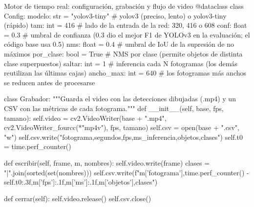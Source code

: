 \documentclass[11pt,letterpaper]{article}
\begin{document}
\begin{codigo}[label=cod:flujo]{Motor de tiempo real: configuración, grabación y flujo de video}
@dataclass
class Config:
    modelo: str = "yolov3-tiny"     # yolov3 (preciso, lento) o yolov3-tiny (rápido)
    tam: int = 416                  # lado de la entrada de la red: 320, 416 o 608
    conf: float = 0.3               # umbral de confianza (0.3 dio el mejor F1 de YOLOv3 en la evaluación; el código base usa 0.5)
    nms: float = 0.4                # umbral de IoU de la supresión de no máximos
    por_clase: bool = True          # NMS por clase (permite objetos de distinta clase superpuestos)
    saltar: int = 1                 # inferencia cada N fotogramas (los demás reutilizan las últimas cajas)
    ancho_max: int = 640            # los fotogramas más anchos se reducen antes de procesarse


class Grabador:
    """Guarda el video con las detecciones dibujadas (.mp4) y un CSV con las métricas de cada fotograma."""
    def __init__(self, base, fps, tamano):
        self.video = cv2.VideoWriter(base + ".mp4", cv2.VideoWriter_fourcc(*"mp4v"), fps, tamano)
        self.csv = open(base + ".csv", "w")
        self.csv.write("fotograma,segundos,fps,ms_inferencia,objetos,clases\n")
        self.t0 = time.perf_counter()

    def escribir(self, frame, m, nombres):
        self.video.write(frame)
        clases = "|".join(sorted(set(nombres)))
        self.csv.write(f"{m['fotograma']},{time.perf_counter() - self.t0:.3f},{m['fps']:.1f},{m['ms']:.1f},{m['objetos']},{clases}\n")

    def cerrar(self):
        self.video.release()
        self.csv.close()



\end{codigo}
\end{document}
